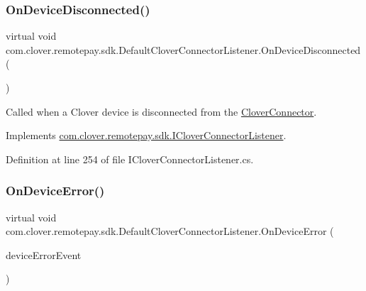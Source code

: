\subsubsection{\texorpdfstring{On\+Device\+Disconnected()}{OnDeviceDisconnected()}}
{\footnotesize\ttfamily virtual void com.\+clover.\+remotepay.\+sdk.\+Default\+Clover\+Connector\+Listener.\+On\+Device\+Disconnected (\begin{DoxyParamCaption}{ }\end{DoxyParamCaption})\hspace{0.3cm}{\ttfamily [virtual]}}



Called when a Clover device is disconnected from the \hyperlink{classcom_1_1clover_1_1remotepay_1_1sdk_1_1_clover_connector}{Clover\+Connector}. 



Implements \hyperlink{interfacecom_1_1clover_1_1remotepay_1_1sdk_1_1_i_clover_connector_listener_abd56956db2761cb9cfcd2af83647bb8f}{com.\+clover.\+remotepay.\+sdk.\+I\+Clover\+Connector\+Listener}.



Definition at line 254 of file I\+Clover\+Connector\+Listener.\+cs.

\mbox{\label{classcom_1_1clover_1_1remotepay_1_1sdk_1_1_default_clover_connector_listener_af1b973a12629519c039d2fa64da62606}} 
\subsubsection{\texorpdfstring{On\+Device\+Error()}{OnDeviceError()}}
{\footnotesize\ttfamily virtual void com.\+clover.\+remotepay.\+sdk.\+Default\+Clover\+Connector\+Listener.\+On\+Device\+Error (\begin{DoxyParamCaption}\item[{\hyperlink{classcom_1_1clover_1_1remotepay_1_1sdk_1_1_clover_device_error_event}{Clover\+Device\+Error\+Event}}]{device\+Error\+Event }\end{DoxyParamCaption})\hspace{0.3cm}{\ttfamily [virtual]}}



